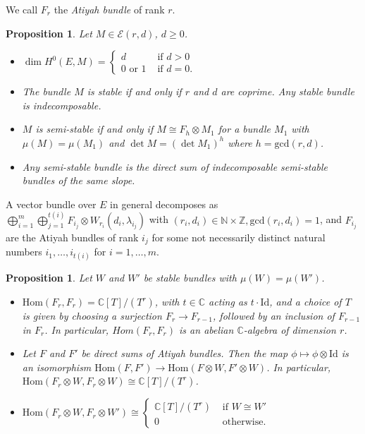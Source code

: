 \documentclass[12pt,oneside,reqno]{amsart}
\newtheorem{prop}[theorem]{Proposition}
\theoremstyle{definition}
\begin{document}
We call $F_r$ the \textit{Atiyah bundle} of rank $r$.

\begin{prop}
Let $M \in \mathcal{E}(r, d)$, $d \geq 0$. 
\begin{itemize}
\item[(1)] $\dim H^0(E, M) = \begin{cases} d & \textrm{ if } d > 0 \\ 0 \textrm{ or } 1 & \textrm{ if } d = 0. \end{cases}$
\item[(2)] The bundle $M$ is stable if and only if $r$ and $d$ are coprime. Any stable bundle is indecomposable. 
\item[(3)] $M$ is semi-stable if and only if $M \cong F_h \otimes M_1$ for a bundle $M_1$ with $\mu(M) = \mu(M_1)$ and $\det M = (\det M_1)^h$ where $h = \mathrm{gcd}(r, d)$.
\item[(4)] Any semi-stable bundle is the direct sum of indecomposable semi-stable bundles of the same slope. 
\end{itemize}
\end{prop}

A vector bundle over $E$ in general decomposes as $\bigoplus_{i = 1}^{m} \bigoplus_{j = 1}^{t(i)}F_{i_j} \otimes W_{r_i}(d_i, \lambda_{i_j})$ with $(r_i, d_i) \in \mathbb{N} \times \mathbb{Z}, \mathrm{gcd}(r_i, d_i) = 1$, and $F_{i_j}$ are the Atiyah bundles of rank $i_j$ for some not necessarily distinct natural numbers $i_1, \dots, i_{t(i)}$ for $i = 1, \dots, m$. 

\begin{prop}Let $W$ and $W'$ be stable bundles with $\mu (W) = \mu (W')$. 
\begin{itemize}
\item[(1)] $\mathrm{Hom}(F_r, F_r) = \mathbb{C}[T]/(T^r)$, with $t \in \mathbb{C}$ acting as $t \cdot \mathrm{Id}$, and a choice of $T$ is given by choosing a surjection $F_r \to F_{r - 1}$, followed by an inclusion of $F_{r - 1}$ in $F_r$. In particular, $Hom(F_r, F_r)$ is an abelian $ \mathbb{C}$-algebra of dimension $r$.
\item[(2)] Let $F$ and $F'$ be direct sums of Atiyah bundles. Then the map $\phi \mapsto \phi \otimes \mathrm{Id}$ is an isomorphism $\mathrm{Hom}(F, F') \to \mathrm{Hom}(F \otimes W, F' \otimes W)$. In particular, $\mathrm{Hom}(F_r \otimes W, F_r \otimes W) \cong \mathbb{C}[T]/(T^r)$.
\item[(3)] $\mathrm{Hom}(F_r \otimes W, F_r \otimes W') \cong \begin{cases} \mathbb{C}[T]/(T^r) & \textrm{ if } W \cong W' \\ 0 & \textrm{ otherwise. } \end{cases}$
\end{itemize}
\end{prop}
\end{document}
